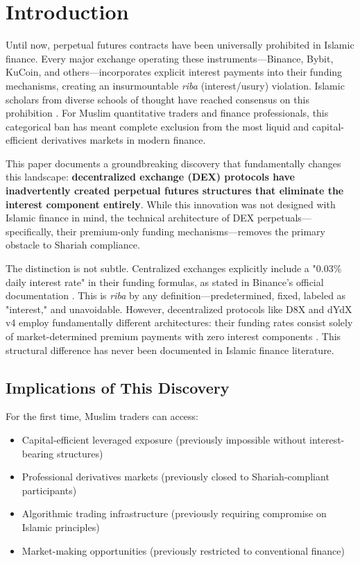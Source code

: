 \documentclass[10pt,twocolumn]{article}
\begin{document}
\section{Introduction}

Until now, perpetual futures contracts have been universally prohibited in Islamic finance. Every major exchange operating these instruments—Binance, Bybit, KuCoin, and others—incorporates explicit interest payments into their funding mechanisms, creating an insurmountable \textit{riba} (interest/usury) violation. Islamic scholars from diverse schools of thought have reached consensus on this prohibition \citep{Musaffa2024, PracticalIF2023}. For Muslim quantitative traders and finance professionals, this categorical ban has meant complete exclusion from the most liquid and capital-efficient derivatives markets in modern finance.

This paper documents a groundbreaking discovery that fundamentally changes this landscape: \textbf{decentralized exchange (DEX) protocols have inadvertently created perpetual futures structures that eliminate the interest component entirely}. While this innovation was not designed with Islamic finance in mind, the technical architecture of DEX perpetuals—specifically, their premium-only funding mechanisms—removes the primary obstacle to Shariah compliance.

The distinction is not subtle. Centralized exchanges explicitly include a "0.03\% daily interest rate" in their funding formulas, as stated in Binance's official documentation \citep{Binance2019}. This is \textit{riba} by any definition—predetermined, fixed, labeled as "interest," and unavoidable. However, decentralized protocols like D8X and dYdX v4 employ fundamentally different architectures: their funding rates consist solely of market-determined premium payments with zero interest components \citep{D8X2024, dYdX2024}. This structural difference has never been documented in Islamic finance literature.

\subsection{Implications of This Discovery}

For the first time, Muslim traders can access:
\begin{itemize}
    \item Capital-efficient leveraged exposure (previously impossible without interest-bearing structures)
    \item Professional derivatives markets (previously closed to Shariah-compliant participants)
    \item Algorithmic trading infrastructure (previously requiring compromise on Islamic principles)
    \item Market-making opportunities (previously restricted to conventional finance)
\end{itemize}
\end{document}
